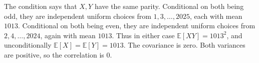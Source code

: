 The condition says that $X,Y$ have the same parity. Conditional on both being odd, they are independent uniform choices from $1,3,\ldots,2025$, each with mean $1013$. Conditional on both being even, they are independent uniform choices from $2,4,\ldots,2024$, again with mean $1013$. Thus in either case $\mathbb E[XY]=1013^2$, and unconditionally $\mathbb E[X]=\mathbb E[Y]=1013$. The covariance is zero. Both variances are positive, so the correlation is $\boxed0$.
